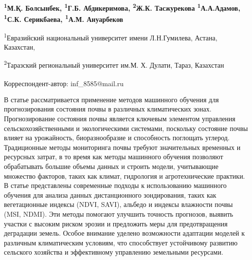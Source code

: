 
\begin{articleheader}

{\bfseries
\textsuperscript{1}М.Қ. Болсынбек,
\textsuperscript{1}Г.Б. Абдикеримова,
\textsuperscript{2}Ж.К. Тасжурекова
\textsuperscript{1}А.А.Адамов,
\textsuperscript{1}С.К. Серикбаева\textsuperscript{\envelope },
\textsuperscript{1}А.М. Ануарбеков
}
\end{articleheader}

\begin{affiliation}
\textsuperscript{1}Евразийский национальный университет имени Л.Н.Гумилева, Астана, Казахстан,

\textsuperscript{2}Таразский региональный университет им.М. Х. Дулати, Тараз, Казахстан

\raggedright \textsuperscript{\envelope }Корреспондент-автор: inf\_8585@mail.ru
\end{affiliation}

В статье рассматривается применение методов машинного обучения для
прогнозирования состояния почвы в различных климатических зонах.
Прогнозирование состояния почвы является ключевым элементом управления
сельскохозяйственными и экологическими системами, поскольку состояние
почвы влияет на урожайность, биоразнообразие и способность поглощать
углерод. Традиционные методы мониторинга почвы требуют значительных
временных и ресурсных затрат, в то время как методы машинного обучения
позволяют обрабатывать большие объемы данных и строить модели,
учитывающие множество факторов, таких как климат, гидрология и
агротехнические практики. В статье представлены современные подходы к
использованию машинного обучения для анализа данных дистанционного
зондирования, таких как вегетационные индексы (NDVI, SAVI), альбедо и
индексы влажности почвы (MSI, NDMI). Эти методы помогают улучшить
точность прогнозов, выявить участки с высоким риском эрозии и предложить
меры для предотвращения деградации земель. Особое внимание уделено
возможности адаптации моделей к различным климатическим условиям, что
способствует устойчивому развитию сельского хозяйства и эффективному
управлению земельными ресурсами.

